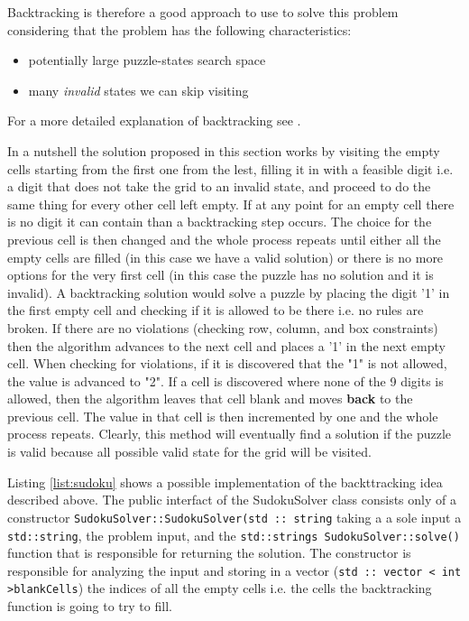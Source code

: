 Backtracking is therefore a good approach to use to solve this problem considering that the problem
has the following characteristics:
\begin{itemize}
	\item potentially large puzzle-states search space
	\item many \textit{invalid} states we can skip visiting
\end{itemize}
For a more detailed explanation of backtracking see \cite{backtracking}.

In a nutshell the solution proposed in this section works by visiting the empty cells starting from
the first one from the lest, filling it in with a feasible digit i.e. a digit that does not take the
grid to an invalid state, and proceed to do the same thing for every other cell left empty. If at
any point for an empty cell there is no digit it can contain than a backtracking step occurs. The
choice for the previous cell is then changed and the whole process repeats until either all the
empty cells are filled (in this case we have a valid solution) or there is no more options for the
very first cell (in this case the puzzle has no solution and it is invalid). A backtracking solution
would solve a puzzle by placing the digit '1' in the first empty cell and checking if it is allowed
to be there i.e. no rules are broken. If there are no violations (checking row, column, and box
constraints) then the algorithm advances to the next cell and places a '1' in the next empty cell.
When checking for violations, if it is discovered that the "1" is not allowed, the value is advanced
to "2". If a cell is discovered where none of the 9 digits is allowed, then the algorithm leaves
that cell blank and moves \textbf{back} to the previous cell. The value in that cell is then
incremented by one and the whole process repeats. Clearly, this method will eventually find a
solution if the puzzle is valid because all possible valid state for the grid will be visited. 


Listing \ref{list:sudoku} shows a possible implementation of the backttracking idea described above.
The public interfact of the SudokuSolver class consists only of a constructor
\lstinline[columns=fixed]{SudokuSolver::SudokuSolver(std :: string} taking a a sole input a
\lstinline[columns=fixed]{std::string}, the problem input, and the
\lstinline[columns=fixed]{std::strings SudokuSolver::solve()} function that is responsible for
returning the solution. The constructor is responsible for analyzing the input and storing in a
vector (\lstinline[columns=fixed]{std :: vector < int >blankCells}) the indices of all the empty
cells i.e. the cells the backtracking function is going to try to fill.

